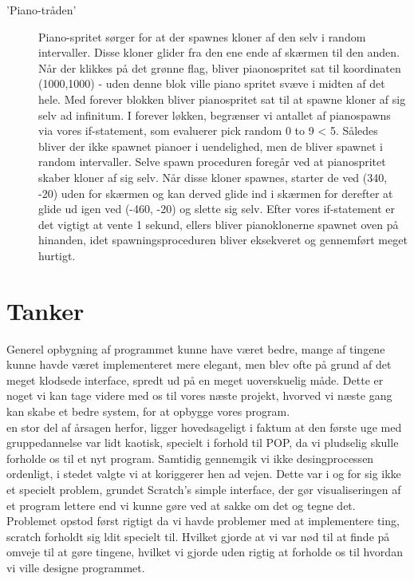 \documentclass[12pt, a4paper, hidelinks]{article}
\begin{document}
\begin{description}
\item['Piano-tråden'] Piano-spritet sørger for at der spawnes kloner af den selv i random intervaller. Disse kloner glider fra den ene ende af skærmen til den anden.
Når der klikkes på det grønne flag, bliver piaonospritet sat til koordinaten (1000,1000) - uden denne blok ville piano spritet svæve i midten af det hele. Med forever blokken bliver pianospritet sat til at spawne kloner af sig selv ad infinitum. I forever løkken, begrænser vi antallet af pianospawns via vores if-statement, som evaluerer pick random 0 to 9 < 5. Således bliver der ikke spawnet pianoer i uendelighed, men de bliver spawnet i random intervaller. Selve spawn proceduren foregår ved at pianospritet skaber kloner af sig selv.  Når disse kloner spawnes, starter de ved (340, -20) uden for skærmen og kan derved glide ind i skærmen for derefter at glide ud igen ved (-460, -20) og slette sig selv.
Efter vores if-statement er det vigtigt at vente 1 sekund, ellers bliver pianoklonerne spawnet oven på hinanden, idet spawningsproceduren bliver eksekveret og gennemført meget hurtigt.

\end{description}


\section{Tanker}

Generel opbygning af programmet kunne have været bedre, mange af tingene kunne havde været implementeret mere elegant, men blev ofte på grund af det meget klodsede interface, spredt ud på en meget uoverskuelig måde. Dette er noget vi kan tage videre med os til vores næste projekt, hvorved vi næste gang kan skabe et bedre system, for at opbygge vores program.\\
en stor del af årsagen herfor, ligger hovedsageligt i faktum at den første uge med gruppedannelse var lidt kaotisk, specielt i forhold til POP, da vi pludselig skulle forholde os til et nyt program. Samtidig gennemgik vi ikke desingprocessen ordenligt, i stedet valgte vi at koriggerer hen ad vejen. Dette var i og for sig ikke et specielt problem, grundet Scratch's simple interface, der gør visualiseringen af et program lettere end vi kunne gøre ved at sakke om det og tegne det. Problemet opstod først rigtigt da vi havde problemer med at implementere ting, scratch forholdt sig ldit specielt til. Hvilket gjorde at vi var nød til at finde på omveje til at gøre tingene, hvilket vi gjorde uden rigtig at forholde os til hvordan vi ville designe programmet.





\end{document}
